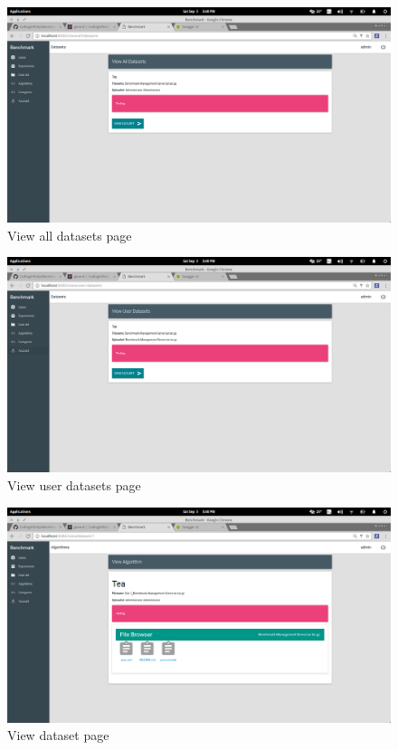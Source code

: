 \documentclass[11pt,a4paper]{article}
\begin{document}
\begin{figure}[H]
	\begin{center}
		\includegraphics[scale=0.3]{../Images/User Manual/View All Datasets.png}
		\caption{View all datasets page}
		\label{fig:viewAllData}
	\end{center}  
\end{figure}
\begin{figure}[H]
	\begin{center}
		\includegraphics[scale=0.3]{../Images/User Manual/View User Datasets.png}
		\caption{View user datasets page}
		\label{fig:viewUserData}
	\end{center}  
\end{figure}
\begin{figure}[H]
	\begin{center}
		\includegraphics[scale=0.3]{../Images/User Manual/View Dataset.png}
		\caption{View dataset page}
		\label{fig:viewData}
	\end{center}  
\end{figure}
\end{document}

